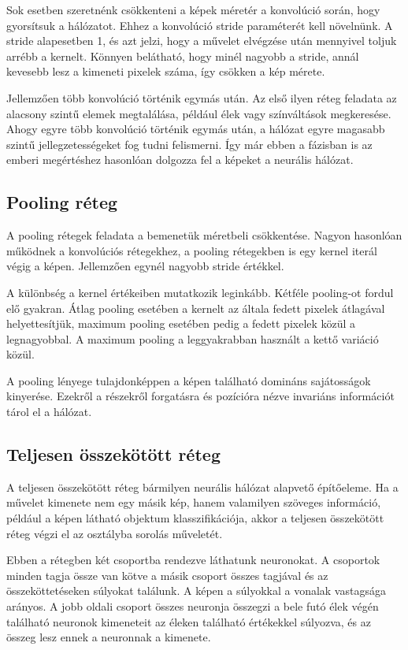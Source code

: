 Sok esetben szeretnénk csökkenteni a képek méretér a konvolúció során, hogy gyorsítsuk a hálózatot. Ehhez a konvolúció stride paraméterét kell növelnünk. A stride alapesetben 1, és azt jelzi, hogy a művelet elvégzése után mennyivel toljuk arrébb a kernelt. Könnyen belátható, hogy minél nagyobb a stride, annál kevesebb lesz a kimeneti pixelek száma, így csökken a kép mérete.

Jellemzően több konvolúció történik egymás után. Az első ilyen réteg feladata az alacsony szintű elemek megtalálása, például élek vagy színváltások megkeresése. Ahogy egyre több konvolúció történik egymás után, a hálózat egyre magasabb szintű jellegzetességeket fog tudni felismerni. Így már ebben a fázisban is az emberi megértéshez hasonlóan dolgozza fel a képeket a neurális hálózat.
\cite{ConvNetExplain}

\subsection{Pooling réteg}
A pooling rétegek feladata a bemenetük méretbeli csökkentése. Nagyon hasonlóan működnek a konvolúciós rétegekhez, a pooling rétegekben is egy kernel iterál végig a képen. Jellemzően egynél nagyobb stride értékkel.

A különbség a kernel értékeiben mutatkozik leginkább. Kétféle pooling-ot fordul elő gyakran. Átlag pooling esetében a kernelt az általa fedett pixelek átlagával helyettesítjük, maximum pooling esetében pedig a fedett pixelek közül a legnagyobbal. A maximum pooling a leggyakrabban használt a kettő variáció közül.

A pooling lényege tulajdonképpen a képen található domináns sajátosságok kinyerése. Ezekről a részekről forgatásra és pozícióra nézve invariáns információt tárol el a hálózat.\cite{ConvNetExplain}

\subsection{Teljesen összekötött réteg}
A teljesen összekötött réteg bármilyen neurális hálózat alapvető építőeleme. Ha a művelet kimenete nem egy másik kép, hanem valamilyen szöveges információ, például a képen látható objektum klasszifikációja, akkor a teljesen összekötött réteg végzi el az osztályba sorolás műveletét.


Ebben a rétegben két csoportba rendezve láthatunk neuronokat. A csoportok minden tagja össze van kötve a másik csoport összes tagjával és az összeköttetéseken súlyokat találunk. A képen a súlyokkal a vonalak vastagsága arányos. A jobb oldali csoport összes neuronja összegzi a bele futó élek végén található neuronok kimeneteit az éleken található értékekkel súlyozva, és az összeg lesz ennek a neuronnak a kimenete.

